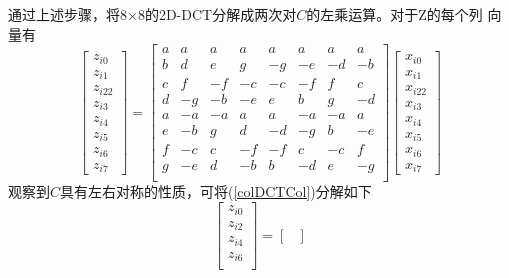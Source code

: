 \documentclass{article}
\numberwithin {equation}{section}
\begin{document}
\begin{spacing}{1.25}
\begin{equation}
        \label{rowColDCT}
      \end{equation}
      通过上述步骤，将8×8的2D-DCT分解成两次对$C$的左乘运算。对于Z的每个列
      向量有
      \begin{equation}
        \begin{bmatrix}
          z_{i0}\\z_{i1}\\z_{i22}\\z_{i3}\\z_{i4}\\z_{i5}\\z_{i6}\\z_{i7}
        \end{bmatrix}=\begin{bmatrix}
          a & a   & a   & a   & a   & a   & a   & a\\
          b & d   & e   & g   & -g  & -e  & -d  & -b\\
          c & f   & -f  & -c  & -c  & -f  & f   & c\\
          d & -g  & -b  & -e  & e   & b   & g   & -d\\
          a & -a  & -a  & a   & a   & -a  & -a  & a\\
          e & -b  & g   & d   & -d  & -g  & b   & -e\\
          f & -c  & c   & -f  & -f  & c   & -c  & f\\
          g & -e  & d   & -b  & b   & -d  & e   & -g\\
        \end{bmatrix}\begin{bmatrix}
          x_{i0}\\x_{i1}\\x_{i22}\\x_{i3}\\x_{i4}\\x_{i5}\\x_{i6}\\x_{i7}
        \end{bmatrix}
        \label{colDCTCol}
      \end{equation}
      观察到$C$具有左右对称的性质，可将(\ref{colDCTCol})分解如下
      \begin{equation}
        \begin{bmatrix}
          z_{i0}\\z_{i2}\\z_{i4}\\z_{i6}\\
        \end{bmatrix}=\begin{bmatrix}

\end{bmatrix}
\end{equation}
\end{spacing}
\end{document}
